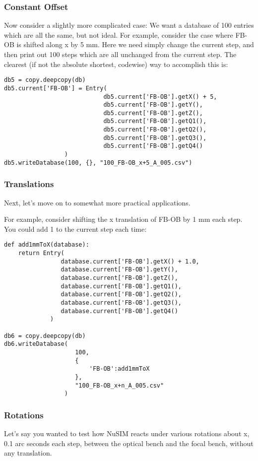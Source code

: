 \subsubsection{Constant Offset}
Now consider a slightly more complicated case: 
We want a database of 100 entries which are all the same, but not ideal. 
For example, consider the case where FB-OB is shifted along x by 5 mm.
Here we need simply change the current step, and then print out 100 steps 
which are all unchanged from the current step.
The clearest (if not the absolute shortest, codewise) way to accomplish 
this is:
\begin{verbatim}
db5 = copy.deepcopy(db)
db5.current['FB-OB'] = Entry(
                            db5.current['FB-OB'].getX() + 5,
                            db5.current['FB-OB'].getY(),
                            db5.current['FB-OB'].getZ(),
                            db5.current['FB-OB'].getQ1(),
                            db5.current['FB-OB'].getQ2(),
                            db5.current['FB-OB'].getQ3(),
                            db5.current['FB-OB'].getQ4()
                 )
db5.writeDatabase(100, {}, "100_FB-OB_x+5_A_005.csv")
\end{verbatim}

\subsubsection{Translations}
Next, let's move on to somewhat more practical applications. 

For example, consider shifting the x translation of FB-OB by 1 mm each 
step. You could add 1 to the current step each time:
\begin{verbatim}
def add1mmToX(database):
    return Entry(
                database.current['FB-OB'].getX() + 1.0,
                database.current['FB-OB'].getY(),
                database.current['FB-OB'].getZ(),
                database.current['FB-OB'].getQ1(),
                database.current['FB-OB'].getQ2(),
                database.current['FB-OB'].getQ3(),
                database.current['FB-OB'].getQ4()
             )

db6 = copy.deepcopy(db)
db6.writeDatabase(
                    100, 
                    {
                        'FB-OB':add1mmToX
                    }, 
                    "100_FB-OB_x+n_A_005.csv"
                 )
\end{verbatim}



\subsubsection{Rotations}
Let's say you wanted to test how NuSIM reacts under various rotations about 
x, 0.1 arc seconds each step, between the optical bench and the focal 
bench, without any translation. 


